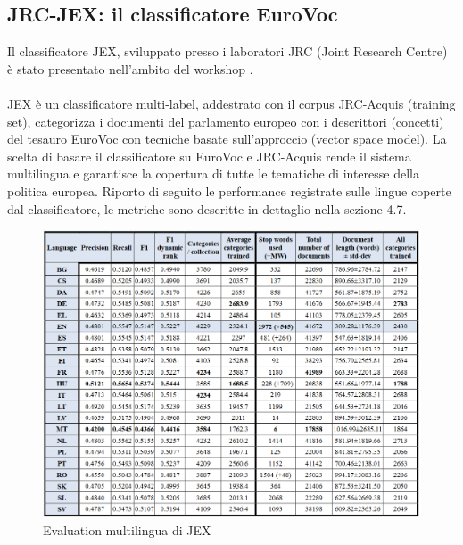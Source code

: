 \documentclass{article}
\theoremstyle{plain}
\theoremstyle{definition}
\begin{document}
\subsection{JRC-JEX: il classificatore EuroVoc}
Il classificatore JEX, sviluppato presso i laboratori JRC (Joint Research Centre) è stato presentato nell'ambito del workshop . 
\\
\\
JEX è un classificatore multi-label, addestrato con il corpus JRC-Acquis (training set), categorizza i documenti del parlamento europeo con i descrittori (concetti) del tesauro EuroVoc con tecniche basate sull'approccio  (vector space model).
La scelta di basare il classificatore su EuroVoc e JRC-Acquis rende il sistema multilingua e garantisce la copertura di tutte le tematiche di interesse della politica europea. Riporto di seguito le performance registrate sulle lingue coperte dal classificatore, le metriche sono descritte in dettaglio nella sezione 4.7.
\begin{figure}[htbp]
\begin{center}
\includegraphics[scale=0.70]{img/statjex.png}
\caption{Evaluation multilingua di JEX}
\end{center}
\end{figure}
\newpage
\end{document}
